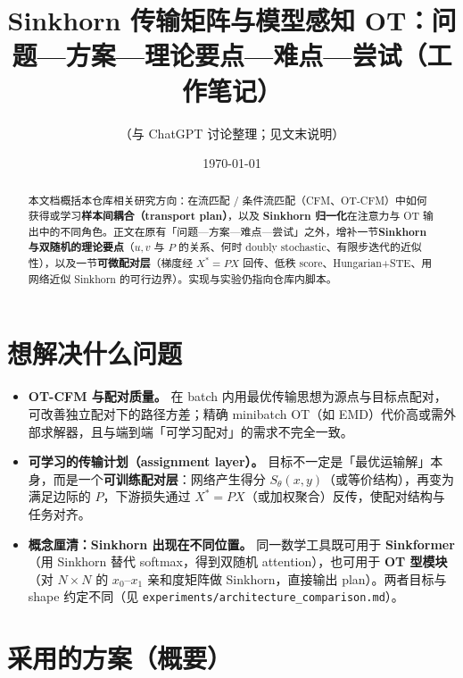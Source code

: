 \documentclass[UTF8]{ctexart}
\title{Sinkhorn 传输矩阵与模型感知 OT：问题—方案—理论要点—难点—尝试（工作笔记）}
\author{（与 ChatGPT 讨论整理；见文末说明）}
\date{\today}
\begin{document}
\maketitle

\begin{abstract}
本文档概括本仓库相关研究方向：在流匹配 / 条件流匹配（CFM、OT-CFM）中如何获得或学习\textbf{样本间耦合（transport plan）}，以及 \textbf{Sinkhorn 归一化}在注意力与 OT 输出中的不同角色。正文在原有「问题—方案—难点—尝试」之外，增补一节\textbf{Sinkhorn 与双随机的理论要点}（$u,v$ 与 $P$ 的关系、何时 doubly stochastic、有限步迭代的近似性），以及一节\textbf{可微配对层}（梯度经 $X^\ast=PX$ 回传、低秩 score、Hungarian+STE、用网络近似 Sinkhorn 的可行边界）。实现与实验仍指向仓库内脚本。
\end{abstract}

\section{想解决什么问题}

\begin{itemize}
  \item \textbf{OT-CFM 与配对质量。}
    在 batch 内用最优传输思想为源点与目标点配对，可改善独立配对下的路径方差；精确 minibatch OT（如 EMD）代价高或需外部求解器，且与端到端「可学习配对」的需求不完全一致。
  \item \textbf{可学习的传输计划（assignment layer）。}
    目标不一定是「最优运输解」本身，而是一个\textbf{可训练配对层}：网络产生得分 $S_\theta(x,y)$（或等价结构），再变为满足边际的 $P$，下游损失通过 $X^\ast=PX$（或加权聚合）反传，使配对结构与任务对齐。
  \item \textbf{概念厘清：Sinkhorn 出现在不同位置。}
    同一数学工具既可用于 \textbf{Sinkformer}（用 Sinkhorn 替代 softmax，得到双随机 attention），也可用于 \textbf{OT 型模块}（对 $N\times N$ 的 $x_0$--$x_1$ 亲和度矩阵做 Sinkhorn，直接输出 plan）。两者目标与 shape 约定不同（见 \texttt{experiments/architecture\_comparison.md}）。
\end{itemize}

\section{采用的方案（概要）}
\end{document}
